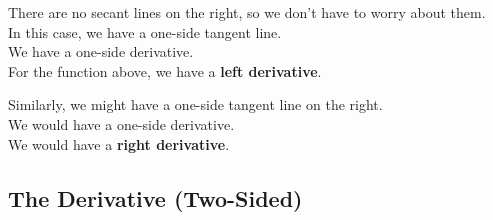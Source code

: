 \documentclass{ximera}
\begin{document}
There are no secant lines on the right, so we don't have to worry about them. \\





In this case, we have a one-side tangent line.  \\

We have a one-side derivative. \\


For the function above, we have a \textbf{left derivative}.












Similarly, we might have a one-side tangent line on the right.  \\

We would have a one-side derivative. \\


We would have a \textbf{right derivative}.






\subsection*{The Derivative (Two-Sided)}
\end{document}
